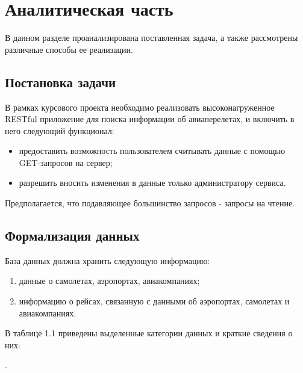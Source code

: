 \chapter{Аналитическая часть}

В данном разделе проанализирована поставленная задача, а также рассмотрены различные способы ее реализации. 

\section{Постановка задачи}

В рамках курсового проекта необходимо реализовать высоконагруженное RESTful \cite{rest-api} приложение для поиска информации об авиаперелетах, и включить в него следующий функционал:
\begin{itemize}
 	\item предоставить возможность пользователем считывать данные с помощью GET-запросов на сервер;
 	\item разрешить вносить изменения в данные только администратору сервиса.
\end{itemize}

Предполагается, что подавляющее большинство запросов - запросы на чтение.


\section{Формализация данных}

База данных должна хранить следующую информацию:
\begin{enumerate}
	\item данные о самолетах, аэропортах, авиакомпаниях;
	\item информацию о рейсах, связанную с данными об аэропортах, самолетах и авиакомпаниях.
\end{enumerate}

В таблице 1.1 приведены выделенные категории данных и краткие сведения о них:
\begin{table}.
	\caption{Категории данных}
\end{table}


